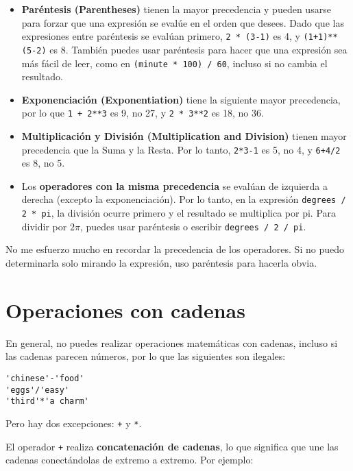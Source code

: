 \begin{itemize}
\item \textbf{Paréntesis (Parentheses)} tienen la mayor precedencia y pueden usarse para forzar que una expresión se evalúe en el orden que desees. Dado que las expresiones entre paréntesis se evalúan primero, \texttt{2 * (3-1)} es 4, y \texttt{(1+1)**(5-2)} es 8. También puedes usar paréntesis para hacer que una expresión sea más fácil de leer, como en \texttt{(minute * 100) / 60}, incluso si no cambia el resultado.

\item \textbf{Exponenciación (Exponentiation)} tiene la siguiente mayor precedencia, por lo que \texttt{1 + 2**3} es 9, no 27, y \texttt{2 * 3**2} es 18, no 36.

\item \textbf{Multiplicación y División (Multiplication and Division)} tienen mayor precedencia que la Suma y la Resta. Por lo tanto, \texttt{2*3-1} es 5, no 4, y \texttt{6+4/2} es 8, no 5.

\item Los \textbf{operadores con la misma precedencia} se evalúan de izquierda a derecha (excepto la exponenciación). Por lo tanto, en la expresión \texttt{degrees / 2 * pi}, la división ocurre primero y el resultado se multiplica por pi. Para dividir por $2\pi$, puedes usar paréntesis o escribir \texttt{degrees / 2 / pi}.
\end{itemize}

No me esfuerzo mucho en recordar la precedencia de los operadores. Si no puedo determinarla solo mirando la expresión, uso paréntesis para hacerla obvia.

\section{Operaciones con cadenas}

En general, no puedes realizar operaciones matemáticas con cadenas, incluso si las cadenas parecen números, por lo que las siguientes son ilegales:

\begin{lstlisting}
'chinese'-'food'
'eggs'/'easy'
'third'*'a charm'
\end{lstlisting}

Pero hay dos excepciones: \texttt{+} y \texttt{*}.

El operador \texttt{+} realiza \textbf{concatenación de cadenas}, lo que significa que une las cadenas conectándolas de extremo a extremo. Por ejemplo:

